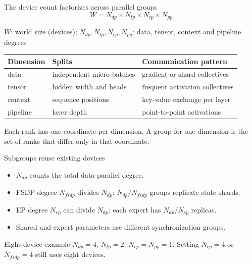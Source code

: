 \documentclass[handout]{beamer}
\begin{document}
\begin{frame}{The device count factorizes across parallel groups}
  \[
    W=N_{dp}\times N_{tp}\times N_{cp}\times N_{pp}
  \]
  \par\vspace{-4pt}
  {\centering\footnotesize $W$: world size (devices); $N_{dp},N_{tp},N_{cp},N_{pp}$: data, tensor, context and pipeline degrees\par}
  \small
  \begin{tabular}{lll}
    \toprule
    Dimension & Splits & Communication pattern \\
    \midrule
    data & independent micro-batches & gradient or shard collectives \\
    tensor & hidden width and heads & frequent activation collectives \\
    context & sequence positions & key-value exchange per layer \\
    pipeline & layer depth & point-to-point activations \\
    \bottomrule
  \end{tabular}
  \vfill
  Each rank has one coordinate per dimension. A group for one dimension is the set of ranks that differ only in that coordinate.
\end{frame}

\begin{frame}{Subgroups reuse existing devices}
  \begin{itemize}
      \setlength{\itemsep}{9pt}
    \item $N_{dp}$ counts the total data-parallel degree.
    \item FSDP degree $N_{fsdp}$ divides $N_{dp}$: $N_{dp}/N_{fsdp}$ groups replicate state shards.
    \item EP degree $N_{ep}$ can divide $N_{dp}$: each expert has $N_{dp}/N_{ep}$ replicas.
    \item Shared and expert parameters use different synchronization groups.
  \end{itemize}
  \begin{block}{Eight-device example}
    $N_{dp}=4$, $N_{tp}=2$, $N_{cp}=N_{pp}=1$. Setting $N_{ep}=4$ or $N_{fsdp}=4$ still uses eight devices.
  \end{block}
\end{frame}
\end{document}
